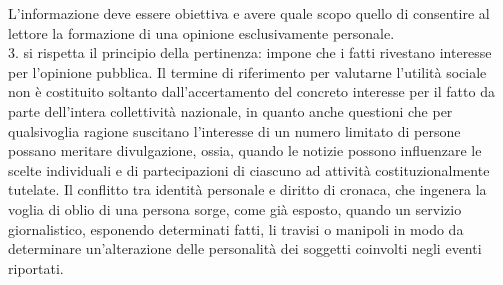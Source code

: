L'informazione deve essere obiettiva e avere quale scopo quello di consentire al lettore la formazione di una opinione esclusivamente personale.
\\3. si rispetta il principio della pertinenza: impone che i fatti rivestano interesse per l'opinione pubblica. Il termine di riferimento per valutarne l'utilità sociale non è costituito soltanto dall'accertamento del concreto interesse per il fatto da parte dell'intera collettività nazionale, in quanto anche questioni che per qualsivoglia ragione suscitano l'interesse di un numero limitato di persone possano meritare divulgazione, ossia, quando le notizie possono influenzare le scelte individuali e di partecipazioni di ciascuno ad attività costituzionalmente tutelate. %
Il conflitto tra identità personale e diritto di cronaca, che ingenera la voglia di oblio di una persona sorge, come già esposto, quando un servizio giornalistico, esponendo determinati fatti, li travisi o manipoli in modo da determinare un'alterazione delle personalità dei soggetti coinvolti negli eventi riportati. %

